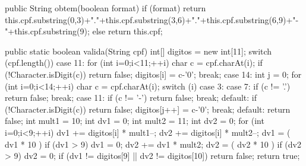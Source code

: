 \documentclass[onecolumn,a4paper,10pt]{report}
\newcommand{\+}{\, + \,}
\newcommand{\<}{\hspace*{-0.4cm}}
\begin{document}
\begin{enumerate}
{\begin{javacode}
{    public String obtem(boolean format) {
        if (format)
            return this.cpf.substring(0,3)+"."+this.cpf.substring(3,6)+"."+this.cpf.substring(6,9)+"-"+this.cpf.substring(9);
        else
            return this.cpf;
    }

    public static boolean valida(String cpf) {
        int[] digitos = new int[11];
        switch (cpf.length()) {
            case 11:
                 for (int i=0;i<11;++i) {
                     char c = cpf.charAt(i);
                     if (!Character.isDigit(c))
                        return false;
                     digitos[i] = c-'0';
                 }
                 break;
            case 14:
                 int j = 0;
                 for (int i=0;i<14;++i) {
                     char c = cpf.charAt(i);
                     switch (i) {
                         case 3:
                         case 7:
                              if (c != '.')
                                 return false;
                              break;
                         case 11:
                              if (c != '-')
                                 return false;
                              break;
                         default:
                              if (!Character.isDigit(c))
                                 return false;
                              digitos[j++] = c-'0';
                     }
                 }
                 break;
            default:
                 return false;
        }
        int mult1 = 10;
        int dv1 = 0;
        int mult2 = 11;
        int dv2 = 0;
        for (int i=0;i<9;++i) {
            dv1 += digitos[i] * mult1--;
            dv2 += digitos[i] * mult2--;
        }
        dv1 = ( dv1 * 10 ) %
        if (dv1 > 9)
           dv1 = 0;
        dv2 += dv1 * mult2;
        dv2 = ( dv2 * 10 ) %
        if (dv2 > 9)
           dv2 = 0;
        if (dv1 != digitos[9] || dv2 != digitos[10])
           return false;
        return true;
    }

}
\end{javacode}
}
\newpage


\end{enumerate}
\end{document}
